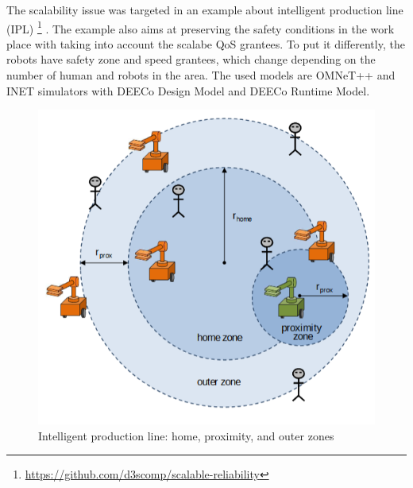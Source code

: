 The scalability issue was targeted in an example about intelligent production line (IPL) \footnote{\url{https://github.com/d3scomp/scalable-reliability}} \cite{Matena2017enssca}. The example also aims at preserving the safety conditions in the work place with taking into account the scalabe QoS grantees. To put it differently, the robots have safety zone and speed grantees, which change depending on the number of human and robots in the area. The used models are OMNeT++ and INET simulators with DEECo Design Model and DEECo Runtime Model.
\begin{figure}[!htb]
\centering
\includegraphics[scale=0.50]{figures/productionline}
\caption{Intelligent production line: home, proximity, and outer zones}
\label{fig:productionline}
\end{figure}

